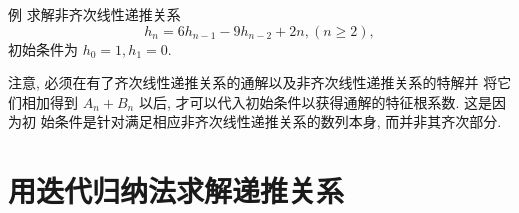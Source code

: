 \documentclass[punct]{ctexbeamer}
\begin{document}
\begin{frame}
    \begin{block}{例}
        求解非齐次线性递推关系
        $$
        h_n=6 h_{n-1}-9 h_{n-2}+2 n,(n \geq 2),
        $$
        初始条件为 $h_0=1, h_1=0$.
    \end{block}

    注意, 必须在有了齐次线性递推关系的通解以及非齐次线性递推关系的特解并 将它们相加得到 $A_n+B_n$ 以后, 才可以代入初始条件以获得通解的特征根系数. 这是因为初 始条件是针对满足相应非齐次线性递推关系的数列本身, 而并非其齐次部分.
\end{frame}

\section{用迭代归纳法求解递推关系}
\end{document}
